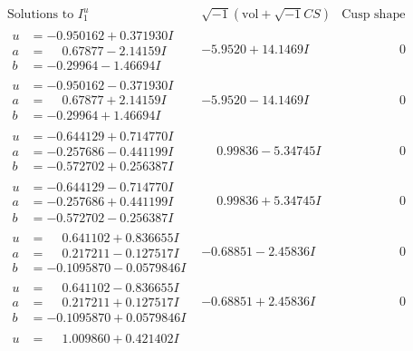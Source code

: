 \documentclass[1p]{elsarticle_modified}
\theoremstyle{definition}
\newcommand{\I}{\sqrt{-1}}
\begin{document}
$$\begin{array}{c|c|c}  
\text{Solutions to }I^u_{1}& \I (\text{vol} + \sqrt{-1}CS) & \text{Cusp shape}\\
 \hline 
\begin{aligned}
u &= -0.950162 + 0.371930 I \\
a &= \phantom{-}0.67877 - 2.14159 I \\
b &= -0.29964 - 1.46694 I\end{aligned}
 & -5.9520 + 14.1469 I & \phantom{-0.000000 } 0 \\ \hline\begin{aligned}
u &= -0.950162 - 0.371930 I \\
a &= \phantom{-}0.67877 + 2.14159 I \\
b &= -0.29964 + 1.46694 I\end{aligned}
 & -5.9520 - 14.1469 I & \phantom{-0.000000 } 0 \\ \hline\begin{aligned}
u &= -0.644129 + 0.714770 I \\
a &= -0.257686 - 0.441199 I \\
b &= -0.572702 + 0.256387 I\end{aligned}
 & \phantom{-}0.99836 - 5.34745 I & \phantom{-0.000000 } 0 \\ \hline\begin{aligned}
u &= -0.644129 - 0.714770 I \\
a &= -0.257686 + 0.441199 I \\
b &= -0.572702 - 0.256387 I\end{aligned}
 & \phantom{-}0.99836 + 5.34745 I & \phantom{-0.000000 } 0 \\ \hline\begin{aligned}
u &= \phantom{-}0.641102 + 0.836655 I \\
a &= \phantom{-}0.217211 - 0.127517 I \\
b &= -0.1095870 - 0.0579846 I\end{aligned}
 & -0.68851 - 2.45836 I & \phantom{-0.000000 } 0 \\ \hline\begin{aligned}
u &= \phantom{-}0.641102 - 0.836655 I \\
a &= \phantom{-}0.217211 + 0.127517 I \\
b &= -0.1095870 + 0.0579846 I\end{aligned}
 & -0.68851 + 2.45836 I & \phantom{-0.000000 } 0 \\ \hline\begin{aligned}
u &= \phantom{-}1.009860 + 0.421402 I \\

\end{aligned}
\end{array}$$
\end{document}
